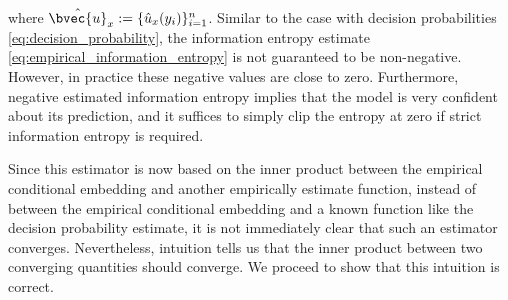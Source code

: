 \documentclass{article}
\begin{document}
		where $\hat{\bvec{u}}_{x} := \{\hat{u}_{x}(y_{i})\}_{i = 1}^{n}$. Similar to the case with decision probabilities \eqref{eq:decision_probability}, the information entropy estimate \eqref{eq:empirical_information_entropy} is not guaranteed to be non-negative. However, in practice these negative values are close to zero. Furthermore, negative estimated information entropy implies that the model is very confident about its prediction, and it suffices to simply clip the entropy at zero if strict information entropy is required. 
		
		Since this estimator is now based on the inner product between the empirical conditional embedding and another empirically estimate function, instead of between the empirical conditional embedding and a known function like the decision probability estimate, it is not immediately clear that such an estimator converges. Nevertheless, intuition tells us that the inner product between two converging quantities should converge. We proceed to show that this intuition is correct.
		
\end{document}
